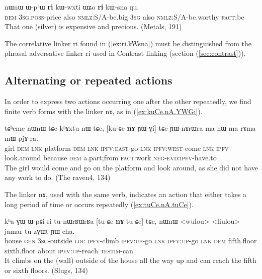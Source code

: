 \documentclass[oldfontcommands,oneside,a4paper,11pt]{article}
\newcommand{\ipa}[1]{{\phon \mbox{#1}}} %
\newcommand{\refb}[1]{(\ref{#1})}
\begin{document}
 \begin{exe}
\ex \label{ex:ri.kWsna}
\gll
\ipa{nɯnɯ}  	\ipa{ɯ-pʰɯ}  	\ipa{\textbf{ri}}  	\ipa{kɯ-wxti}  	\ipa{ɯʑo}  	\ipa{\textbf{ri}}  	\ipa{kɯ-sna}  	\ipa{ŋu.}  \\
\textsc{dem} \textsc{3sg.poss}-price also \textsc{nmlz:S/A}-be.big \textsc{3sg} also \textsc{nmlz:S/A}-be.worthy \textsc{fact}:be \\
\glt That one (silver) is expensive and precious. (Metals, 191)
\end{exe}

The correlative linker \ipa{ri} found in \refb{ex:ri.kWsna} must be distinguished from the phrasal adversative linker \ipa{ri} used in Contrast linking (section \refb{sec:contrast}).




\subsection{Alternating or repeated actions} \label{sec:alternating}

In order to express two actions occurring one after the other repeatedly, we find finite verb forms with the linker \ipa{nɤ}, as in \refb{ex:kuCe.nA.YWGi}.

\begin{exe}
\ex \label{ex:kuCe.nA.YWGi}
\gll
\ipa{tɕʰeme}  	\ipa{nɯnɯ}  	\ipa{tɕe}  	\ipa{kʰɤxtu}  	\ipa{nɯ}  	\ipa{tɕe,}  	[\ipa{ku-ɕe}  	\ipa{\textbf{nɤ}}  	\ipa{ɲɯ-ɣi}]  	\ipa{tɕe}  	\ipa{ɲɯ-nɤrɯra}  	\ipa{ma}  	\ipa{nɯ}  	\ipa{ma}  	\ipa{rɤma}  	\ipa{mɯ-pjɤ-ra.}  \\
girl \textsc{dem} \textsc{lnk} platform \textsc{dem} \textsc{lnk} \textsc{ipfv:east}-go \textsc{lnk} \textsc{ipfv:west}-come \textsc{lnk} \textsc{ipfv}-look.around because \textsc{dem} a.part;from \textsc{fact}:work \textsc{neg-evd:ipfv}-have.to \\ 
\glt The girl would come and go on the platform and look around, as she did not have any work to do. (The raven4, 134)
\end{exe}


The linker \ipa{nɤ}, used with the same verb, indicates an action that either takes a long period of time or occurs repeatedly \refb{ex:tuCe.nA.tuCe}.
\begin{exe}
\ex \label{ex:tuCe.nA.tuCe}
\gll
\ipa{kʰa}  	\ipa{ɣɯ}  	\ipa{ɯ-pɕi}  	\ipa{ri}  	\ipa{tu-nɯrʁɯrʁa}  	[\ipa{tu-ɕe}  	\ipa{\textbf{nɤ}}  	\ipa{tu-ɕe}]  	\ipa{tɕe,}  	\ipa{nɯnɯ}  	<wulou>  	<liulou>  	\ipa{jamar}  	\ipa{tu-zɣɯt}  	\ipa{ɲɯ-cha.}  \\
house \textsc{gen} \textsc{3sg}-outside \textsc{loc} \textsc{ipfv}-climb \textsc{ipfv:up}-go \textsc{lnk} \textsc{ipfv:up}-go \textsc{lnk} \textsc{dem} fifth.floor sixth.floor about \textsc{ipfv:up}-reach \textsc{testim}-can \\
\glt It climbs on the (wall) outside of the house all the way up and can reach the fifth or   sixth floors.
(Slugs, 134)
\end{exe}
 
\end{document}

